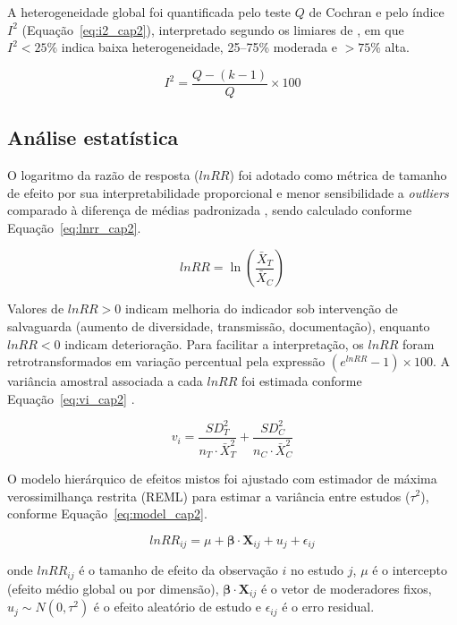 A heterogeneidade global foi quantificada pelo teste $Q$ de Cochran e pelo índice $I^2$ (Equação~\ref{eq:i2_cap2}), interpretado segundo os limiares de , em que $I^2 < 25\%$ indica baixa heterogeneidade, 25--75\% moderada e $> 75\%$ alta.

\begin{equation}
I^2 = \frac{Q - (k-1)}{Q} \times 100
\label{eq:i2_cap2}
\end{equation}

\subsection{Análise estatística}
\label{sec:stats_cap2}

O logaritmo da razão de resposta ($lnRR$) foi adotado como métrica de tamanho de efeito por sua interpretabilidade proporcional e menor sensibilidade a \textit{outliers} comparado à diferença de médias padronizada \cite{Hedges1999}, sendo calculado conforme Equação~\ref{eq:lnrr_cap2}.

\begin{equation}
lnRR = \ln\left(\frac{\bar{X}_{T}}{\bar{X}_{C}}\right)
\label{eq:lnrr_cap2}
\end{equation}

\noindent Valores de $lnRR > 0$ indicam melhoria do indicador sob intervenção de salvaguarda (aumento de diversidade, transmissão, documentação), enquanto $lnRR < 0$ indicam deterioração. Para facilitar a interpretação, os $lnRR$ foram retrotransformados em variação percentual pela expressão $(e^{lnRR} - 1) \times 100$. A variância amostral associada a cada $lnRR$ foi estimada conforme Equação~\ref{eq:vi_cap2} \cite{Hedges1999}.

\begin{equation}
v_i = \frac{SD_T^2}{n_T \cdot \bar{X}_T^2} + \frac{SD_C^2}{n_C \cdot \bar{X}_C^2}
\label{eq:vi_cap2}
\end{equation}

O modelo hierárquico de efeitos mistos foi ajustado com estimador de máxima verossimilhança restrita (REML) para estimar a variância entre estudos ($\tau^2$), conforme Equação~\ref{eq:model_cap2}.

\begin{equation}
lnRR_{ij} = \mu + \boldsymbol{\beta} \cdot \mathbf{X}_{ij} + u_j + \epsilon_{ij}
\label{eq:model_cap2}
\end{equation}

\noindent onde $lnRR_{ij}$ é o tamanho de efeito da observação $i$ no estudo $j$, $\mu$ é o intercepto (efeito médio global ou por dimensão), $\boldsymbol{\beta} \cdot \mathbf{X}_{ij}$ é o vetor de moderadores fixos, $u_j \sim N(0, \tau^2)$ é o efeito aleatório de estudo e $\epsilon_{ij}$ é o erro residual.

